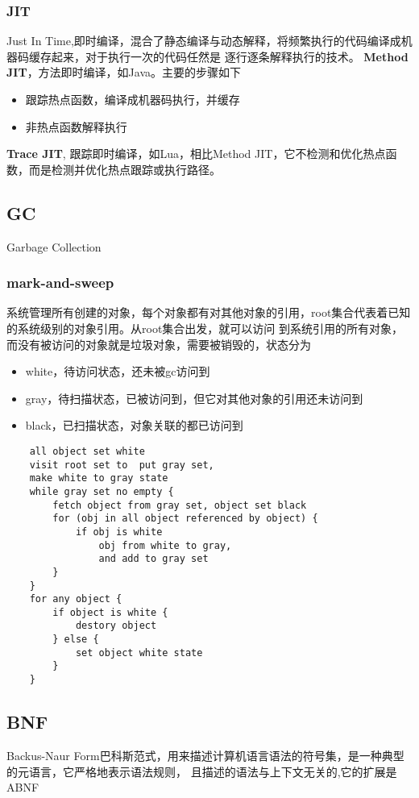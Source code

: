 \subsubsection{JIT}
Just In Time,即时编译，混合了静态编译与动态解释，将频繁执行的代码编译成机器码缓存起来，对于执行一次的代码任然是
逐行逐条解释执行的技术。
\newline
\textbf{Method JIT}，方法即时编译，如Java。主要的步骤如下
\begin{itemize}
    \item {跟踪热点函数，编译成机器码执行，并缓存}
    \item {非热点函数解释执行}
\end{itemize}
\textbf{Trace JIT}, 跟踪即时编译，如Lua，相比Method JIT，它不检测和优化热点函数，而是检测并优化热点跟踪或执行路径。

\subsection{GC}
Garbage Collection
\subsubsection{mark-and-sweep}
系统管理所有创建的对象，每个对象都有对其他对象的引用，root集合代表着已知的系统级别的对象引用。从root集合出发，就可以访问
到系统引用的所有对象，而没有被访问的对象就是垃圾对象，需要被销毁的，状态分为
\begin{itemize}
    \item {white，待访问状态，还未被gc访问到}
    \item {gray，待扫描状态，已被访问到，但它对其他对象的引用还未访问到}
    \item {black，已扫描状态，对象关联的都已访问到}
\end{itemize}
\begin{lstlisting}
    all object set white
    visit root set to  put gray set,
    make white to gray state 
    while gray set no empty {
        fetch object from gray set, object set black 
        for (obj in all object referenced by object) {
            if obj is white 
                obj from white to gray, 
                and add to gray set 
        }
    }
    for any object {
        if object is white {
            destory object 
        } else {
            set object white state
        }
    }
\end{lstlisting}

\subsection{BNF}
Backus-Naur Form巴科斯范式，用来描述计算机语言语法的符号集，是一种典型的元语言，它严格地表示语法规则，
且描述的语法与上下文无关的,它的扩展是ABNF 
\cite{ABNF}

